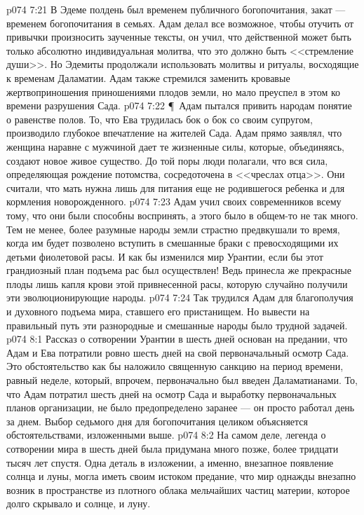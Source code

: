 \vs p074 7:21 В Эдеме полдень был временем публичного богопочитания, закат --- временем богопочитания в семьях. Адам делал все возможное, чтобы отучить от привычки произносить заученные тексты, он учил, что действенной может быть только абсолютно индивидуальная молитва, что это должно быть <<стремление души>>. Но Эдемиты продолжали использовать молитвы и ритуалы, восходящие к временам Даламатии. Адам также стремился заменить кровавые жертвоприношения приношениями плодов земли, но мало преуспел в этом ко времени разрушения Сада.
\vs p074 7:22 \P\ Адам пытался привить народам понятие о равенстве полов. То, что Ева трудилась бок о бок со своим супругом, производило глубокое впечатление на жителей Сада. Адам прямо заявлял, что женщина наравне с мужчиной дает те жизненные силы, которые, объединяясь, создают новое живое существо. До той поры люди полагали, что вся сила, определяющая рождение потомства, сосредоточена в <<чреслах отца>>. Они считали, что мать нужна лишь для питания еще не родившегося ребенка и для кормления новорожденного.
\vs p074 7:23 Адам учил своих современников всему тому, что они были способны воспринять, а этого было в общем\hyp{}то не так много. Тем не менее, более разумные народы земли страстно предвкушали то время, когда им будет позволено вступить в смешанные браки с превосходящими их детьми фиолетовой расы. И как бы изменился мир Урантии, если бы этот грандиозный план подъема рас был осуществлен! Ведь принесла же прекрасные плоды лишь капля крови этой привнесенной расы, которую случайно получили эти эволюционирующие народы.
\vs p074 7:24 Так трудился Адам для благополучия и духовного подъема мира, ставшего его пристанищем. Но вывести на правильный путь эти разнородные и смешанные народы было трудной задачей.
\vs p074 8:1 Рассказ о сотворении Урантии в шесть дней основан на предании, что Адам и Ева потратили ровно шесть дней на свой первоначальный осмотр Сада. Это обстоятельство как бы наложило священную санкцию на период времени, равный неделе, который, впрочем, первоначально был введен Даламатианами. То, что Адам потратил шесть дней на осмотр Сада и выработку первоначальных планов организации, не было предопределено заранее --- он просто работал день за днем. Выбор седьмого дня для богопочитания целиком объясняется обстоятельствами, изложенными выше.
\vs p074 8:2 На самом деле, легенда о сотворении мира в шесть дней была придумана много позже, более тридцати тысяч лет спустя. Одна деталь в изложении, а именно, внезапное появление солнца и луны, могла иметь своим истоком предание, что мир однажды внезапно возник в пространстве из плотного облака мельчайших частиц материи, которое долго скрывало и солнце, и луну.
